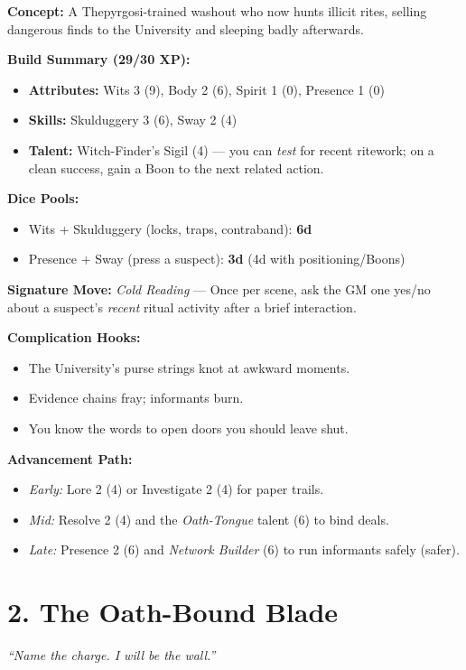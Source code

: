 \begin{multicols}{2}
\textbf{Concept:} A Thepyrgosi-trained washout who now hunts illicit rites, selling dangerous finds to the University and sleeping badly afterwards.

\textbf{Build Summary (29/30 XP):}
\begin{itemize}
  \item \textbf{Attributes:} Wits 3 (9), Body 2 (6), Spirit 1 (0), Presence 1 (0)
  \item \textbf{Skills:} Skulduggery 3 (6), Sway 2 (4)
  \item \textbf{Talent:} Witch-Finder’s Sigil (4) — you can \emph{test} for recent ritework; on a clean success, gain a Boon to the next related action.
\end{itemize}
\textbf{Dice Pools:}
\begin{itemize}
  \item Wits + Skulduggery (locks, traps, contraband): \textbf{6d}
  \item Presence + Sway (press a suspect): \textbf{3d} (4d with positioning/Boons)
\end{itemize}
\textbf{Signature Move:} \emph{Cold Reading} — Once per scene, ask the GM one yes/no about a suspect’s \emph{recent} ritual activity after a brief interaction.

\textbf{Complication Hooks:}
\begin{itemize}
  \item The University’s purse strings knot at awkward moments.
  \item Evidence chains fray; informants burn.
  \item You know the words to open doors you should leave shut.
\end{itemize}

\textbf{Advancement Path:}
\begin{itemize}
  \item \textit{Early:} Lore 2 (4) or Investigate 2 (4) for paper trails.
  \item \textit{Mid:} Resolve 2 (4) and the \emph{Oath-Tongue} talent (6) to bind deals.
  \item \textit{Late:} Presence 2 (6) and \emph{Network Builder} (6) to run informants safely (safer).
\end{itemize}

\section{2. The Oath-Bound Blade}
\textit{“Name the charge. I will be the wall.”}


\end{multicols}

